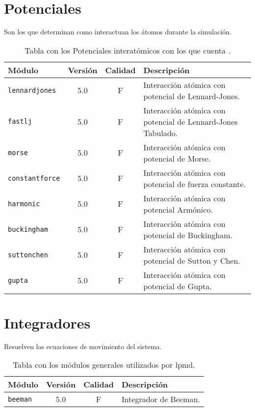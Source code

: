 \section{Potenciales}
Son los que determinan como interactuan los \'atomos durante la simulaci\'on.

\begin{table}[h!]
 \begin{tabular}{|l|c|c|p{10cm}|}\hline
 M\'odulo & Versi\'on & Calidad & Descripci\'on \\
 \hline\hline
 \texttt{lennardjones} & 5.0 & F & Interacci\'on at\'omica con potencial de Lennard-Jones.\\
 \hline
 \texttt{fastlj} & 5.0 & F & Interacci\'on at\'omica con potencial de Lennard-Jones Tabulado.\\
 \hline
 \texttt{morse} & 5.0 & F & Interacci\'on at\'omica con potencial de Morse.\\
 \hline
 \texttt{constantforce} & 5.0 & F & Interacci\'on at\'omica con potencial de fuerza constante.\\
 \hline
 \texttt{harmonic} & 5.0 & F & Interacci\'on at\'omica con potencial Arm\'onico.\\
 \hline
 \texttt{buckingham} & 5.0 & F & Interacci\'on at\'omica con potencial de Buckingham.\\
 \hline
 \texttt{suttonchen} & 5.0 & F & Interacci\'on at\'omica con potencial de Sutton y Chen.\\
 \hline
 \texttt{gupta} & 5.0 & F & Interacci\'on at\'omica con potencial de Gupta.\\
 \hline
 \end{tabular}
\label{tab:modpotentials}
\caption{Tabla con los Potenciales interat\'omicos con los que cuenta \lpmd.}
\end{table}

\section{Integradores}
Resuelven las ecuaciones de movimiento del sistema.

\begin{table}[h!]
 \begin{tabular}{|l|c|c|p{10cm}|}\hline
 M\'odulo & Versi\'on & Calidad & Descripci\'on \\
 \hline\hline
 \texttt{beeman} & 5.0 & F & Integrador de Beeman.\\
 \hline
 \end{tabular}
\label{tab:modginteg}
\caption{Tabla con los m\'odulos generales utilizados por lpmd.}
\end{table}

